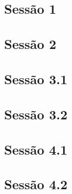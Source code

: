 \documentclass[a4paper,12pt]{article}
\begin{document}
\subsection{Sessão 1}
{
\scriptsize

}

\subsection{Sessão 2}
{
\scriptsize

}

\subsection{Sessão 3.1}
{
\scriptsize

}

\subsection{Sessão 3.2}
{
\scriptsize

}

\subsection{Sessão 4.1}
{
\scriptsize

}

\subsection{Sessão 4.2}
{
\scriptsize

}
\end{document}
